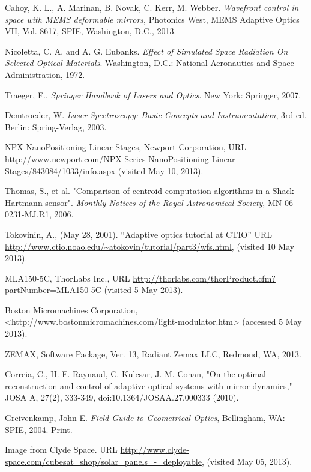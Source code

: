 \documentclass[12pt]{article}
\begin{document}
\begin{thebibliography}{9}
   Cahoy, K. L., A. Marinan, B. Novak, C. Kerr, M. Webber. 
   \emph{Wavefront control in space with MEMS deformable mirrors},
   Photonics West, MEMS Adaptive Optics VII, Vol. 8617, SPIE,
   Washington, D.C., 2013.

   Nicoletta, C. A. and A. G. Eubanks.
   \emph{Effect of Simulated Space Radiation On Selected Optical
     Materials}. Washington, D.C.: National Aeronautics and Space
   Administration, 1972.

   Traeger, F., \emph{Springer Handbook of Lasers and Optics}. New
   York: Springer, 2007.

   Demtroeder, W.
   \emph{Laser Spectroscopy: Basic Concepts and Instrumentation}, 3rd
   ed. Berlin: Spring-Verlag, 2003.

   NPX NanoPositioning Linear Stages, Newport Corporation,
   URL \url{http://www.newport.com/NPX-Series-NanoPositioning-Linear-Stages/843084/1033/info.aspx}
   (visited May 10, 2013).

Thomas, S., et al. "Comparison of centroid computation algorithms in a Shack-Hartmann sensor". \emph{Monthly Notices of the Royal Astronomical Society}, MN-06-0231-MJ.R1, 2006.

   Tokovinin, A., (May 28, 2001). ``Adaptive optics tutorial at CTIO'' URL
   \url{http://www.ctio.noao.edu/~atokovin/tutorial/part3/wfs.html}, 
   (visited 10 May 2013).

   MLA150-5C, ThorLabs Inc.,
   URL \url{http://thorlabs.com/thorProduct.cfm?partNumber=MLA150-5C}
   (visited 5 May 2013).

Boston Micromachines Corporation, <http://www.bostonmicromachines.com/light-modulator.htm> (accessed 5 May 2013).

   ZEMAX, Software Package, Ver. 13, Radiant Zemax LLC, Redmond, WA, 2013.

  Correia, C., H.-F. Raynaud, C. Kulcsar, J.-M. Conan, "On the optimal reconstruction and control of adaptive optical systems with mirror dynamics," JOSA A, 27(2), 333-349, doi:10.1364/JOSAA.27.000333 (2010).

   Greivenkamp, John E. 
   \emph{Field Guide to Geometrical Optics}, Bellingham, WA: SPIE, 2004. Print.



Image from Clyde Space.  URL \url{http://www.clyde-space.com/cubesat_shop/solar_panels_-_deployable}, (visited May 05, 2013).


\end{thebibliography}
\end{document}
